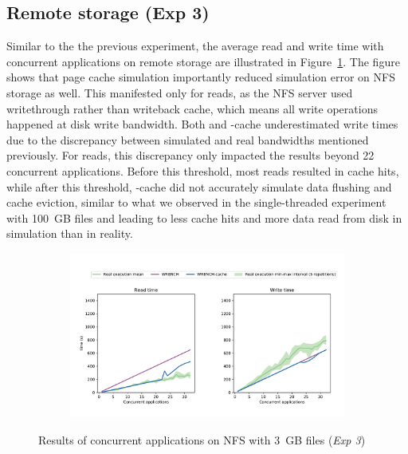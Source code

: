 \FloatBarrier

\subsection{Remote storage (Exp 3)}

Similar to the the previous experiment, the average read and write time 
with concurrent applications on remote storage are illustrated 
in Figure~\ref{fig:multi_nfs}.
The figure shows that page cache simulation importantly reduced 
simulation error on NFS storage as well. 
This manifested only for reads, as the NFS server used writethrough rather 
than writeback cache, which means all write operations happened at disk 
write bandwidth. 
Both \wrench and \wrench-cache
underestimated write times due to the discrepancy between
simulated and real bandwidths mentioned previously. 
For reads, this discrepancy only impacted the results beyond 22
concurrent applications. Before this threshold, most reads resulted in 
cache hits, while after this threshold, \wrench-cache did not accurately 
simulate data flushing and cache eviction, similar to what we observed in 
the single-threaded experiment with 100~GB files and leading to 
less cache hits and more data read from disk in simulation than in reality. 

\begin{figure}[!h]
    \begin{subfigure}{\linewidth}
        \centering
        \includegraphics[width=\linewidth]{result/multi/figures/multi_nfs.pdf}
    \end{subfigure}
    \caption{Results of concurrent applications on NFS with 3~GB files 
    (\textit{Exp 3})}
    \label{fig:multi_nfs}
\end{figure}

